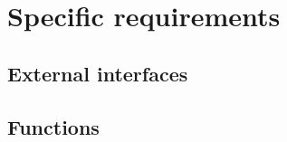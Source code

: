 \documentclass{scrreprt}
\begin{document}
\chapter{Specific requirements}


\section{External interfaces}


\section{Functions}
\end{document}
